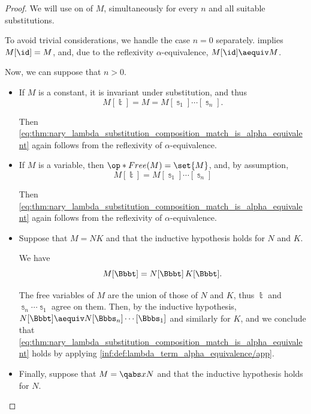 \begin{proof}
  We will use  on of \( M \), simultaneously for every \( n \) and all suitable substitutions.

  To avoid trivial considerations, we handle the case \( n = 0 \) separately.  implies \( M[\id] = M \), and, due to the reflexivity \( \alpha \)-equivalence, \( M[\id] \aequiv M \).

  Now, we can suppose that \( n > 0 \).

  \begin{itemize}
    \item If \( M \) is a constant, it is invariant under substitution, and thus
    \begin{equation*}
      M[\Bbbt] = M = M[\Bbbs_1] \cdots [\Bbbs_n].
    \end{equation*}

    Then \eqref{eq:thm:nary_lambda_substitution_composition_match_is_alpha_equivalent} again follows from the reflexivity of \( \alpha \)-equivalence.

    \item If \( M \) is a variable, then \( \op*{Free}(M) = \set{ M } \), and, by assumption,
    \begin{equation*}
      M[\Bbbt] = M[\Bbbs_1] \cdots [\Bbbs_n]
    \end{equation*}

    Then \eqref{eq:thm:nary_lambda_substitution_composition_match_is_alpha_equivalent} again follows from the reflexivity of \( \alpha \)-equivalence.

    \item Suppose that \( M = NK \) and that the inductive hypothesis holds for \( N \) and \( K \).

    We have
    \begin{equation*}
      M[\Bbbt] = N[\Bbbt] \thinspace K[\Bbbt].
    \end{equation*}

    The free variables of \( M \) are the union of those of \( N \) and \( K \), thus \( \Bbbt \) and \( \Bbbs_n \cdots \Bbbs_1 \) agree on them. Then, by the inductive hypothesis, \( N[\Bbbt] \aequiv N[\Bbbs_n] \cdots [\Bbbs_1] \) and similarly for \( K \), and we conclude that \eqref{eq:thm:nary_lambda_substitution_composition_match_is_alpha_equivalent} holds by applying \ref{inf:def:lambda_term_alpha_equivalence/app}.

    \item Finally, suppose that \( M = \qabs x N \) and that the inductive hypothesis holds for \( N \).


\end{itemize}
\end{proof}
